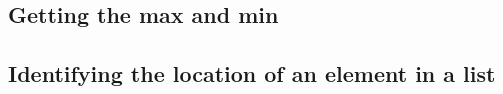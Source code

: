 
\subsection{Getting the max and min}

\subsection{Identifying the location of an element in a list}

